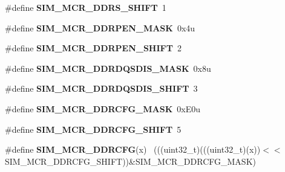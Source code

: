 \begin{DoxyCompactItemize}
\item 
\hypertarget{group___s_i_m___register___masks_ga7f8bd562f3298608ba159fa3b8bd21a0}{}\#define {\bfseries S\+I\+M\+\_\+\+M\+C\+R\+\_\+\+D\+D\+R\+S\+\_\+\+S\+H\+I\+F\+T}~1\label{group___s_i_m___register___masks_ga7f8bd562f3298608ba159fa3b8bd21a0}

\item 
\hypertarget{group___s_i_m___register___masks_ga9036e4ac9a282e3a5789f842a9818ac6}{}\#define {\bfseries S\+I\+M\+\_\+\+M\+C\+R\+\_\+\+D\+D\+R\+P\+E\+N\+\_\+\+M\+A\+S\+K}~0x4u\label{group___s_i_m___register___masks_ga9036e4ac9a282e3a5789f842a9818ac6}

\item 
\hypertarget{group___s_i_m___register___masks_ga74f8af29e11ba0feb06afbc7017e994a}{}\#define {\bfseries S\+I\+M\+\_\+\+M\+C\+R\+\_\+\+D\+D\+R\+P\+E\+N\+\_\+\+S\+H\+I\+F\+T}~2\label{group___s_i_m___register___masks_ga74f8af29e11ba0feb06afbc7017e994a}

\item 
\hypertarget{group___s_i_m___register___masks_ga4939d6d7e0ad54a07d24489c439ed5da}{}\#define {\bfseries S\+I\+M\+\_\+\+M\+C\+R\+\_\+\+D\+D\+R\+D\+Q\+S\+D\+I\+S\+\_\+\+M\+A\+S\+K}~0x8u\label{group___s_i_m___register___masks_ga4939d6d7e0ad54a07d24489c439ed5da}

\item 
\hypertarget{group___s_i_m___register___masks_gaedad84760957e8f5ded97c031c8a85d9}{}\#define {\bfseries S\+I\+M\+\_\+\+M\+C\+R\+\_\+\+D\+D\+R\+D\+Q\+S\+D\+I\+S\+\_\+\+S\+H\+I\+F\+T}~3\label{group___s_i_m___register___masks_gaedad84760957e8f5ded97c031c8a85d9}

\item 
\hypertarget{group___s_i_m___register___masks_gae2d5bbdc8f205b79b04f988bfc4a49d7}{}\#define {\bfseries S\+I\+M\+\_\+\+M\+C\+R\+\_\+\+D\+D\+R\+C\+F\+G\+\_\+\+M\+A\+S\+K}~0x\+E0u\label{group___s_i_m___register___masks_gae2d5bbdc8f205b79b04f988bfc4a49d7}

\item 
\hypertarget{group___s_i_m___register___masks_gabc2b8ce76773dc5d1772588a17fb2c94}{}\#define {\bfseries S\+I\+M\+\_\+\+M\+C\+R\+\_\+\+D\+D\+R\+C\+F\+G\+\_\+\+S\+H\+I\+F\+T}~5\label{group___s_i_m___register___masks_gabc2b8ce76773dc5d1772588a17fb2c94}

\item 
\hypertarget{group___s_i_m___register___masks_ga0c9a702ea72b34c322b87afb69f71ba4}{}\#define {\bfseries S\+I\+M\+\_\+\+M\+C\+R\+\_\+\+D\+D\+R\+C\+F\+G}(x)                                            ~(((uint32\+\_\+t)(((uint32\+\_\+t)(x))$<$$<$S\+I\+M\+\_\+\+M\+C\+R\+\_\+\+D\+D\+R\+C\+F\+G\+\_\+\+S\+H\+I\+F\+T))\&S\+I\+M\+\_\+\+M\+C\+R\+\_\+\+D\+D\+R\+C\+F\+G\+\_\+\+M\+A\+S\+K)\label{group___s_i_m___register___masks_ga0c9a702ea72b34c322b87afb69f71ba4}


\end{DoxyCompactItemize}
